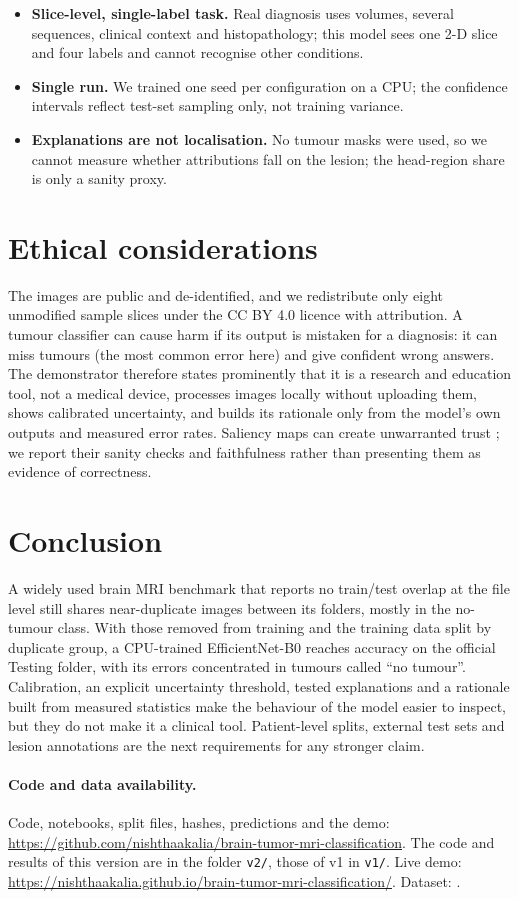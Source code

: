 \documentclass[11pt,a4paper]{article}
\begin{document}
\begin{itemize}
\item \textbf{Slice-level, single-label task.} Real diagnosis uses volumes, several sequences, clinical context and histopathology; this model sees one 2-D slice and four labels and cannot recognise other conditions.
\item \textbf{Single run.} We trained one seed per configuration on a CPU; the confidence intervals reflect test-set sampling only, not training variance.
\item \textbf{Explanations are not localisation.} No tumour masks were used, so we cannot measure whether attributions fall on the lesion; the head-region share is only a sanity proxy.
\end{itemize}

\section{Ethical considerations}
The images are public and de-identified, and we redistribute only eight unmodified sample slices under the CC BY 4.0 licence with attribution. A tumour classifier can cause harm if its output is mistaken for a diagnosis: it can miss tumours (the most common error here) and give confident wrong answers. The demonstrator therefore states prominently that it is a research and education tool, not a medical device, processes images locally without uploading them, shows calibrated uncertainty, and builds its rationale only from the model's own outputs and measured error rates. Saliency maps can create unwarranted trust \citep{adebayo2018,arun2021}; we report their sanity checks and faithfulness rather than presenting them as evidence of correctness.

\section{Conclusion}
A widely used brain MRI benchmark that reports no train/test overlap at the file level still shares near-duplicate images between its folders, mostly in the no-tumour class. With those removed from training and the training data split by duplicate group, a CPU-trained EfficientNet-B0 reaches \AccCFull{} accuracy on the official Testing folder, with its errors concentrated in tumours called ``no tumour''. Calibration, an explicit uncertainty threshold, tested explanations and a rationale built from measured statistics make the behaviour of the model easier to inspect, but they do not make it a clinical tool. Patient-level splits, external test sets and lesion annotations are the next requirements for any stronger claim.

\paragraph{Code and data availability.} Code, notebooks, split files, hashes, predictions and the demo: \url{https://github.com/nishthaakalia/brain-tumor-mri-classification}. The code and results of this version are in the folder \texttt{v2/}, those of v1 in \texttt{v1/}. Live demo: \url{https://nishthaakalia.github.io/brain-tumor-mri-classification/}. Dataset: \citet{nickparvar2021}.



\end{document}
